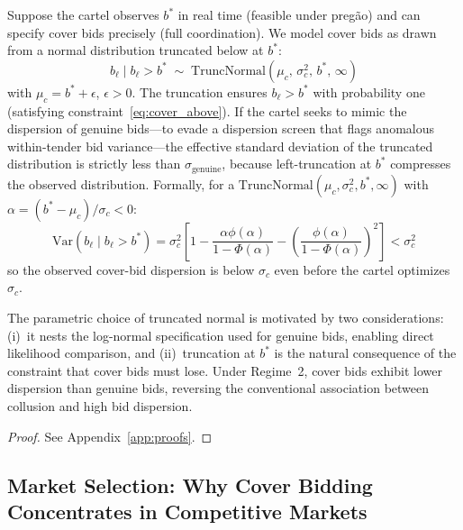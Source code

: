 \begin{proposition}
\label{prop:regime2}
Suppose the cartel observes $b^*$ in real time (feasible under
preg\~ao) and can specify cover bids precisely (full coordination).
We model cover bids as drawn from a normal distribution truncated
below at $b^*$:
\begin{equation}
  b_\ell \mid b_\ell > b^* \;\sim\;
  \text{TruncNormal}(\mu_c,\, \sigma_c^2,\, b^*,\, \infty)
  \label{eq:regime2}
\end{equation}
with $\mu_c = b^* + \epsilon$, $\epsilon > 0$. The truncation
ensures $b_\ell > b^*$ with probability one (satisfying
constraint~\eqref{eq:cover_above}). If the cartel seeks to mimic
the dispersion of genuine bids---to evade a dispersion screen that
flags anomalous within-tender bid variance---the effective standard
deviation of the truncated distribution is strictly less than
$\sigma_{\text{genuine}}$, because left-truncation at $b^*$
compresses the observed distribution. Formally, for a
$\text{TruncNormal}(\mu_c, \sigma_c^2, b^*, \infty)$ with
$\alpha = (b^* - \mu_c)/\sigma_c < 0$:
\begin{equation}
  \text{Var}(b_\ell \mid b_\ell > b^*) = \sigma_c^2
  \left[1 - \frac{\alpha \phi(\alpha)}{1 - \Phi(\alpha)}
  - \left(\frac{\phi(\alpha)}{1 - \Phi(\alpha)}\right)^{\!2}
  \right] < \sigma_c^2
  \label{eq:regime2_var}
\end{equation}
so the observed cover-bid dispersion is below $\sigma_c$ even before
the cartel optimizes $\sigma_c$.
\end{proposition}

\noindent The parametric choice of truncated normal is motivated by
two considerations: (i)~it nests the log-normal specification used
for genuine bids, enabling direct likelihood comparison, and
(ii)~truncation at $b^*$ is the natural consequence of the
constraint that cover bids must lose. Under Regime~2, cover bids
exhibit lower dispersion than genuine bids, reversing the
conventional association between collusion and high bid dispersion.

\begin{proof}
See Appendix~\ref{app:proofs}.
\end{proof}


\subsection{Market Selection: Why Cover Bidding Concentrates in
Competitive Markets}
\label{sec:market_selection}

